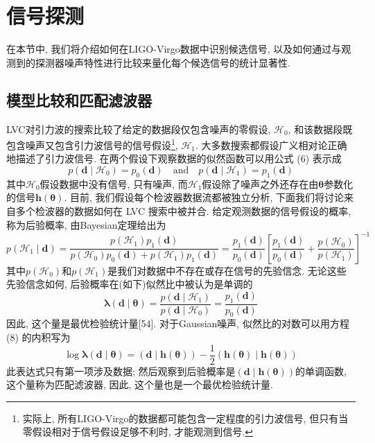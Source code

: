 \documentclass[a4paper]{\documentclassname}
\def\b{\boldsymbol}
\def\t{\text}
\theoremstyle{definition}
\begin{document}
\section{信号探测}

在本节中, 我们将介绍如何在LIGO-Virgo数据中识别候选信号, 以及如何通过与观测到的探测器噪声特性进行比较来量化每个候选信号的统计显著性. 

\subsection{模型比较和匹配滤波器}

LVC对引力波的搜索比较了给定的数据段仅包含噪声的零假设, ${{\mathcal {H}}}_0$, 和该数据段既包含噪声又包含引力波信号的信号假设\footnote{实际上, 所有LIGO-Virgo的数据都可能包含一定程度的引力波信号, 但只有当零假设相对于信号假设足够不利时, 才能观测到信号. }, ${{\mathcal H}}_1$. 大多数搜索都假设广义相对论正确地描述了引力波信号. 在两个假设下观察数据的似然函数可以用公式 (6) 表示成
\begin{equation}
    p(\b{d} \mid{{\mathcal {H}}}_0)=p_0(\b{d})\quad \t{and}\quad p(\b{d} \mid{{\mathcal {H}}}_1)=p_1(\b{d})
\end{equation}
其中${{\mathcal H}}_0$假设数据中没有信号, 只有噪声, 而${{\mathcal H}}_1$假设除了噪声之外还存在由$\b{\theta}$参数化的信号${\b{h}} ({\b{\theta}}) $. 目前, 我们假设每个检波器数据流都被独立分析, 下面我们将讨论来自多个检波器的数据如何在 LVC 搜索中被并合. 给定观测数据的信号假设的概率, 称为后验概率, 由Bayesian定理给出为
\begin{equation}
    p({{\mathcal {H}}}_1 \mid\b{d})=\frac{p({{\mathcal {H}}}_1 )p_1(\b{d})}{p({{\mathcal {H}}}_0 )p_0(\b{d})+p({{\mathcal {H}}}_1 )p_1(\b{d})}=\frac{p_1(\b{d})}{p_0(\b{d})}\left[\frac{p_1(\b{d})}{p_0(\b{d})}+\frac{p({{\mathcal {H}}}_0 )}{p({{\mathcal {H}}}_1 )}\right]^{-1}
\end{equation}
其中$p ({{\mathcal H}}_0) $和$p ({{\mathcal H}}_1) $是我们对数据中不存在或存在信号的先验信念. 无论这些先验信念如何, 后验概率在(如下)似然比中被认为是单调的
\begin{equation}
    \b{\lambda}(\b{d}\mid\b{\theta})=\frac{p(\b{d} \mid{{\mathcal {H}}}_1)}{p(\b{d} \mid{{\mathcal {H}}}_0)}=\frac{p_1(\b{d})}{p_0(\b{d})}
\end{equation}
因此, 这个量是最优检验统计量[54]. 对于Gaussian噪声, 似然比的对数可以用方程 (8) 的内积写为
\begin{equation}
    \log\b{\lambda}(\b{d}\mid\b{\theta})=(\b{d} \mid\b{h}(\b{\theta}))-\frac{1}{2}(\b{h}(\b{\theta}) \mid\b{h}(\b{\theta}))
\end{equation}
此表达式只有第一项涉及数据; 然后观察到后验概率是$ ({\b{d}} \mid {\b{h}} (\b{\theta}) ) $的单调函数, 这个量称为匹配滤波器, 因此, 这个量也是一个最优检验统计量. 
\end{document}
